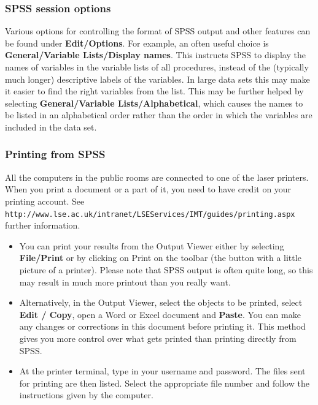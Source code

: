 \documentclass[11pt,a4paper,openany]{book}
\begin{document}
\subsubsection*{SPSS session options}\label{spss-session-options}

Various options for controlling the format of SPSS output and other
features can be found under \textbf{Edit/Options}. For example, an often
useful choice is \textbf{General/Variable Lists/Display names}. This
instructs SPSS to display the names of variables in the variable lists
of all procedures, instead of the (typically much longer) descriptive
labels of the variables. In large data sets this may make it easier to
find the right variables from the list. This may be further helped by
selecting \textbf{General/Variable Lists/Alphabetical}, which causes the
names to be listed in an alphabetical order rather than the order in
which the variables are included in the data set.

\subsubsection*{Printing from SPSS}\label{printing-from-spss}

All the computers in the public rooms are connected to one of the laser
printers. When you print a document or a part of it, you need to have
credit on your printing account. See
\small{\texttt{http://www.lse.ac.uk/intranet/LSEServices/IMT/guides/printing.aspx}}
\normalsizefor further information.

\begin{itemize}
\item
  You can print your results from the Output Viewer either by selecting
  \textbf{File/Print} or by clicking on Print on the toolbar (the button
  with a little picture of a printer). Please note that SPSS output is
  often quite long, so this may result in much more printout than you
  really want.
\item
  Alternatively, in the Output Viewer, select the objects to be printed,
  select \textbf{Edit / Copy}, open a Word or Excel document and
  \textbf{Paste}. You can make any changes or corrections in this
  document before printing it. This method gives you more control over
  what gets printed than printing directly from SPSS.
\item
  At the printer terminal, type in your username and password. The files
  sent for printing are then listed. Select the appropriate file number
  and follow the instructions given by the computer.
\end{itemize}
\end{document}
